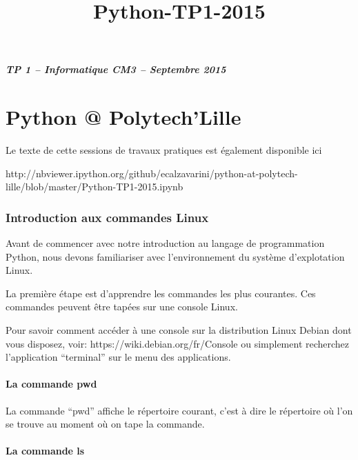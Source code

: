 \documentclass{article}
\title{Python-TP1-2015}
\begin{document}
    
    
    \maketitle
    
    

    
    \subparagraph{TP 1 -- Informatique CM3 -- Septembre
2015}\label{tp-1-informatique-cm3-septembre-2015}

    \section{Python @ Polytech'Lille}\label{python-polytechlille}

    Le texte de cette sessions de travaux pratiques est également disponible
ici

http://nbviewer.ipython.org/github/ecalzavarini/python-at-polytech-lille/blob/master/Python-TP1-2015.ipynb

    \subsubsection{Introduction aux commandes
Linux}\label{introduction-aux-commandes-linux}

    Avant de commencer avec notre introduction au langage de programmation
Python, nous devons familiariser avec l'environnement du système
d'explotation Linux.

La première étape est d'apprendre les commandes les plus courantes. Ces
commandes peuvent être tapées sur une console Linux.

Pour savoir comment accéder à une console sur la distribution Linux
Debian dont vous disposez, voir: https://wiki.debian.org/fr/Console ou
simplement recherchez l'application ``terminal'' sur le menu des
applications.

    \paragraph{La commande pwd}\label{la-commande-pwd}

    La commande ``pwd'' affiche le répertoire courant, c'est à dire le
répertoire où l'on se trouve au moment où on tape la commande.

    \paragraph{La commande ls}\label{la-commande-ls}
\end{document}
